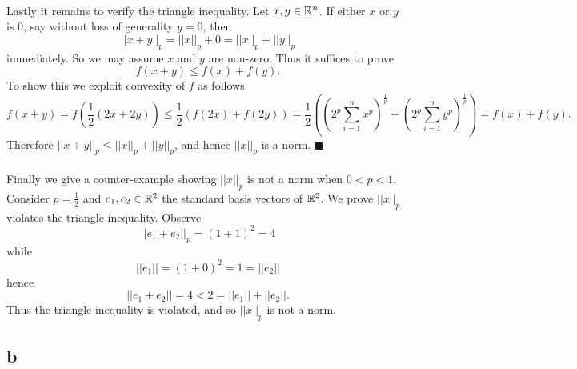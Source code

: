 \documentclass[letterpaper,12pt,oneside,onecolumn]{article}
\begin{document}
\paragraph{}
Lastly it remains to verify the triangle inequality. Let $x, y \in \mathbb{R}^n$. If either $x$ or $y$ is $0$, say without loss of generality $y=0$, then 
$$||x + y||_p = ||x||_p + 0 = ||x||_p + ||y||_p$$
immediately. So we may assume $x$ and $y$ are non-zero. Thus it suffices to prove
$$f(x+y) \leq f(x) + f(y).$$
To show this we exploit convexity of $f$ as follows
$$f(x+y) = f(\frac{1}{2}(2x+2y)) \leq \frac{1}{2}(f(2x) + f(2y)) = \frac{1}{2} ((2^p\sum_{i=1}^n x^p)^\frac{1}{p} +(2^p\sum_{i=1}^n y^p)^\frac{1}{p}) = f(x) + f(y).$$
Therefore $||x + y||_p \leq ||x||_p + ||y||_p$, and hence $||x||_p$ is a norm. $\blacksquare$
\paragraph{}
Finally we give a counter-example showing $||x||_p$ is not a norm when $0 < p < 1$. Consider $p =\frac{1}{2}$ and $e_1, e_2 \in \mathbb{R}^2$ the standard basis vectors of $\mathbb{R}^2$. We prove $||x||_p$ violates the triangle inequality. Observe
$$||e_1 + e_2 ||_p = (1 + 1)^2 = 4$$
while 
$$||e_1|| = (1+0)^2 = 1 = ||e_2||$$
hence 
$$||e_1 + e_2||  = 4 < 2 = ||e_1|| + ||e_2||.$$
Thus the triangle inequality is violated, and so $||x||_p$ is not a norm.
\subsection{b}
\end{document}
